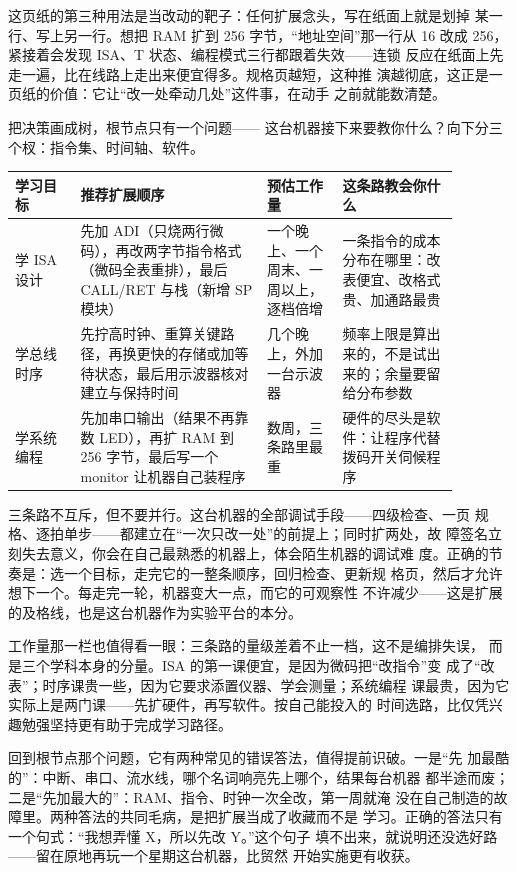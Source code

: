 这页纸的第三种用法是当改动的靶子：任何扩展念头，写在纸面上就是划掉
某一行、写上另一行。想把 RAM 扩到 256 字节，“地址空间”那一行从 16
改成 256，紧接着会发现 ISA、T 状态、编程模式三行都跟着失效——连锁
反应在纸面上先走一遍，比在线路上走出来便宜得多。规格页越短，这种推
演越彻底，这正是一页纸的价值：它让“改一处牵动几处”这件事，在动手
之前就能数清楚。

把决策画成树，根节点只有一个问题——
这台机器接下来要教你什么？向下分三个杈：指令集、时间轴、软件。

\begin{longtable}{L{0.13\linewidth}L{0.37\linewidth}L{0.15\linewidth}L{0.23\linewidth}}
\toprule
学习目标 & 推荐扩展顺序 & 预估工作量 & 这条路教会你什么 \\
\midrule
学 ISA 设计 & 先加 ADI（只烧两行微码），再改两字节指令格式（微码全表重排），最后 CALL/RET 与栈（新增 SP 模块） & 一个晚上、一个周末、一周以上，逐档倍增 & 一条指令的成本分布在哪里：改表便宜、改格式贵、加通路最贵 \\\tablerowrule
学总线时序 & 先拧高时钟、重算关键路径，再换更快的存储或加等待状态，最后用示波器核对建立与保持时间 & 几个晚上，外加一台示波器 & 频率上限是算出来的，不是试出来的；余量要留给分布参数 \\\tablerowrule
学系统编程 & 先加串口输出（结果不再靠数 LED），再扩 RAM 到 256 字节，最后写一个 monitor 让机器自己装程序 & 数周，三条路里最重 & 硬件的尽头是软件：让程序代替拨码开关伺候程序 \\
\bottomrule
\end{longtable}

三条路不互斥，但不要并行。这台机器的全部调试手段——四级检查、一页
规格、逐拍单步——都建立在“一次只改一处”的前提上；同时扩两处，故
障签名立刻失去意义，你会在自己最熟悉的机器上，体会陌生机器的调试难
度。正确的节奏是：选一个目标，走完它的一整条顺序，回归检查、更新规
格页，然后才允许想下一个。每走完一轮，机器变大一点，而它的可观察性
不许减少——这是扩展的及格线，也是这台机器作为实验平台的本分。

工作量那一栏也值得看一眼：三条路的量级差着不止一档，这不是编排失误，
而是三个学科本身的分量。ISA 的第一课便宜，是因为微码把“改指令”变
成了“改表”；时序课贵一些，因为它要求添置仪器、学会测量；系统编程
课最贵，因为它实际上是两门课——先扩硬件，再写软件。按自己能投入的
时间选路，比仅凭兴趣勉强坚持更有助于完成学习路径。

回到根节点那个问题，它有两种常见的错误答法，值得提前识破。一是“先
加最酷的”：中断、串口、流水线，哪个名词响亮先上哪个，结果每台机器
都半途而废；二是“先加最大的”：RAM、指令、时钟一次全改，第一周就淹
没在自己制造的故障里。两种答法的共同毛病，是把扩展当成了收藏而不是
学习。正确的答法只有一个句式：“我想弄懂 X，所以先改 Y。”这个句子
填不出来，就说明还没选好路——留在原地再玩一个星期这台机器，比贸然
开始实施更有收获。

